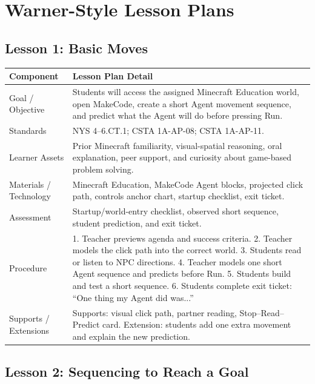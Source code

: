 \documentclass[12pt]{article}
\begin{document}
\newpage
\section{Warner-Style Lesson Plans}

\subsection{Lesson 1: Basic Moves}

\begin{xltabular}{\textwidth}{|P{1.45in}|L|}
\hline
{}\color{white}\bfseries Component & \color{white}\bfseries Lesson Plan Detail \\
\hline
Goal / Objective & Students will access the assigned Minecraft Education world, open MakeCode, create a short Agent movement sequence, and predict what the Agent will do before pressing Run. \\
\hline
{} Standards & NYS 4--6.CT.1; CSTA 1A-AP-08; CSTA 1A-AP-11. \\
\hline
Learner Assets & Prior Minecraft familiarity, visual-spatial reasoning, oral explanation, peer support, and curiosity about game-based problem solving. \\
\hline
{} Materials / Technology & Minecraft Education, MakeCode Agent blocks, projected click path, controls anchor chart, startup checklist, exit ticket. \\
\hline
Assessment & Startup/world-entry checklist, observed short sequence, student prediction, and exit ticket. \\
\hline
{} Procedure & 1. Teacher previews agenda and success criteria. 2. Teacher models the click path into the correct world. 3. Students read or listen to NPC directions. 4. Teacher models one short Agent sequence and predicts before Run. 5. Students build and test a short sequence. 6. Students complete exit ticket: ``One thing my Agent did was...'' \\
\hline
Supports / Extensions & Supports: visual click path, partner reading, Stop--Read--Predict card. Extension: students add one extra movement and explain the new prediction. \\
\hline
\end{xltabular}

\subsection{Lesson 2: Sequencing to Reach a Goal}
\end{document}
